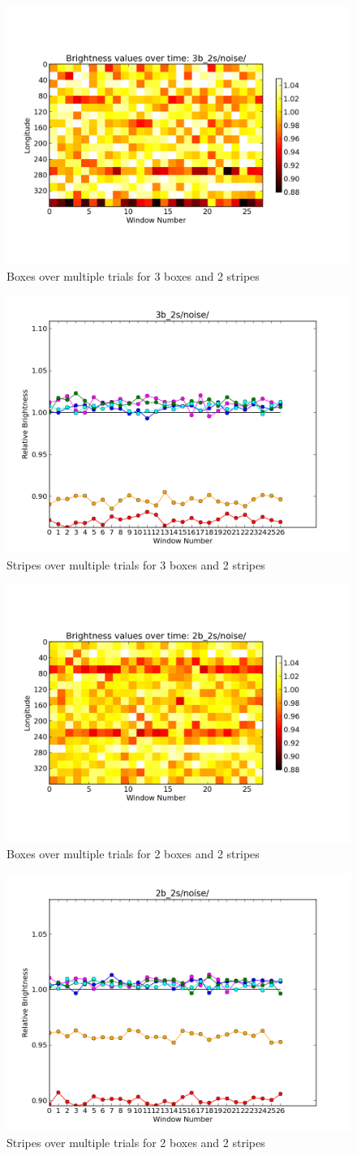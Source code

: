 \documentclass[iop]{emulateapj}
\begin{document}
\begin{figure}[h]
	\centering
	\includegraphics[width=.5\textwidth]{images/3b_2s/noise/region_plot.png}
	\caption{Boxes over multiple trials for 3 boxes and 2 stripes}
	\label{3b_2s/noise}
\end{figure}
\begin{figure}[h]
	\centering
	\includegraphics[width=.5\textwidth]{images/3b_2s/noise/stripes_over_time.png}
	\caption{Stripes over multiple trials for 3 boxes and 2 stripes}
	\label{3b_2s/noise/stripes}
\end{figure}

\begin{figure}[h]
	\centering
	\includegraphics[width=.5\textwidth]{images/2b_2s/noise/region_plot.png}
	\caption{Boxes over multiple trials for 2 boxes and 2 stripes}
	\label{2b_2s/noise}
\end{figure}
\begin{figure}[h]
	\centering
	\includegraphics[width=.5\textwidth]{images/2b_2s/noise/stripes_over_time.png}
	\caption{Stripes over multiple trials for 2 boxes and 2 stripes}
	\label{2b_2s/noise/stripes}
\end{figure}
	
\end{document}
